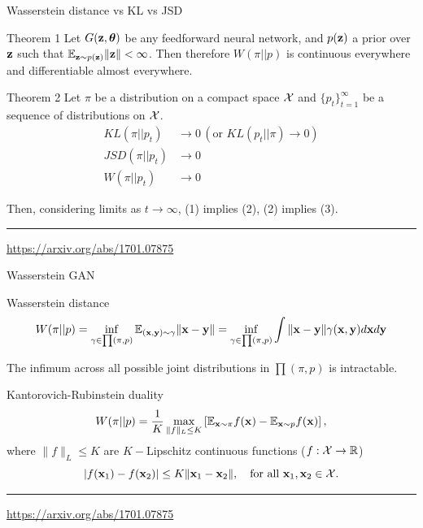 \begin{frame}{Wasserstein distance vs KL vs JSD}
	\begin{block}{Theorem 1}
		Let $G(\mathbf{z}, \boldsymbol{\theta})$ be any feedforward neural network, and $p(\mathbf{z})$ a prior over $\mathbf{z}$ such that $\mathbb{E}_{\mathbf{z} \sim p(\mathbf{z})}
		\|\mathbf{z}\| < \infty$. Then therefore $W(\pi || p)$ is continuous everywhere and differentiable almost everywhere.
	\end{block}
	\begin{block}{Theorem 2}
		Let $\pi$ be a distribution on a compact space $\mathcal{X}$ and $\{p_t\}_{t=1}^\infty$ be a sequence of distributions on $\mathcal{X}$. 
		\begin{align}
			KL(\pi || p_t) &\rightarrow 0 \, (\text{or }KL (p_t || \pi) \rightarrow 0) \\
			JSD(\pi || p_t) &\rightarrow 0 \\
			W(\pi || p_t) &\rightarrow 0
		\end{align}
		
		Then, considering limits as $t \rightarrow \infty$, (1) implies (2), (2) implies (3).
	\end{block}
	\vfill
	\hrule\medskip 
	{\scriptsize \href{https://arxiv.org/abs/1701.07875}{https://arxiv.org/abs/1701.07875}}
\end{frame}
\begin{frame}{Wasserstein GAN}
	\begin{block}{Wasserstein distance}
		\vspace{-0.4cm}
		\[
			W(\pi || p) = \inf_{\gamma \in \prod(\pi, p)} \mathbb{E}_{(\mathbf{x}, \mathbf{y}) \sim \gamma} \| \mathbf{x} - \mathbf{y} \| =  \inf_{\gamma \in \prod(\pi, p)} \int \| \mathbf{x} - \mathbf{y} \| \gamma (\mathbf{x}, \mathbf{y}) d \mathbf{x} d \mathbf{y}
		\]
	\end{block}
	The infimum across all possible joint distributions in $\prod(\pi, p)$ is intractable.
	\begin{block}{Kantorovich-Rubinstein duality}
		\[
			W(\pi || p) = \frac{1}{K} \max_{\| f \|_L \leq K} \left[ \mathbb{E}_{\mathbf{x} \sim \pi} f(\mathbf{x})  - \mathbb{E}_{\mathbf{x} \sim p} f(\mathbf{x})\right],
		\]
		where $\| f \|_L \leq K$ are $K-$Lipschitz continuous functions ($f: \mathcal{X} \rightarrow \mathbb{R}$)
		\[
			|f(\mathbf{x}_1) - f(\mathbf{x}_2)| \leq K \| \mathbf{x}_1 - \mathbf{x}_2 \|, \quad \text{for all } \mathbf{x}_1, \mathbf{x}_2 \in \mathcal{X}.
		\]
	\end{block}
	\vfill
	\hrule\medskip 
	{\scriptsize \href{https://arxiv.org/abs/1701.07875}{https://arxiv.org/abs/1701.07875}}
\end{frame}
